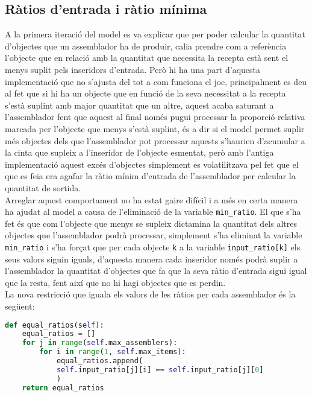 \subsection{Ràtios d'entrada i ràtio mínima}
A la primera iteració del model es va explicar que per poder calcular la quantitat d'objectes que un assemblador ha de produir, calia prendre com a referència l'objecte que en relació amb la quantitat que necessita la recepta està sent el menys suplit pels inseridors d'entrada. Però hi ha una part d'aquesta implementació que no s'ajusta del tot a com funciona el joc, principalment es deu al fet que si hi ha un objecte que en funció de la seva necessitat a la recepta s'està suplint amb major quantitat que un altre, aquest acaba saturant a l'assemblador fent que aquest al final només pugui processar la proporció relativa marcada per l'objecte que menys s'està suplint, és a dir si el model permet suplir més objectes dels que l'assemblador pot processar aquests s'haurien d'acumular a la cinta que supleix a l'inseridor de l'objecte esmentat, però amb l'antiga implementació aquest excés d'objectes simplement es volatilitzava pel fet que el que es feia era agafar la ràtio mínim d'entrada de l'assemblador per calcular la quantitat de sortida.\\
Arreglar aquest comportament no ha estat gaire difícil i a més en certa manera ha ajudat al model a causa de l'eliminació de la variable \texttt{min\_ratio}. El que s'ha fet és que com l'objecte que menys se supleix dictamina la quantitat dels altres objectes que l'assemblador podrà processar, simplement s'ha eliminat la variable \texttt{min\_ratio} i s'ha forçat que per cada objecte \texttt{k} a la variable \texttt{input\_ratio[k]} els seus valors siguin iguals, d'aquesta manera cada inseridor només podrà suplir a l'assemblador la quantitat d'objectes que fa que la seva ràtio d'entrada sigui igual que la resta, fent així que no hi hagi objectes que es perdin.\\

La nova restricció que iguala els valors de les ràtios per cada assemblador és la següent:

\begin{lstlisting}[language=Python, caption=Equal Ratios]
def equal_ratios(self):
    equal_ratios = []
    for j in range(self.max_assemblers):
        for i in range(1, self.max_items):
            equal_ratios.append(
            self.input_ratio[j][i] == self.input_ratio[j][0]
            )
    return equal_ratios
\end{lstlisting}

